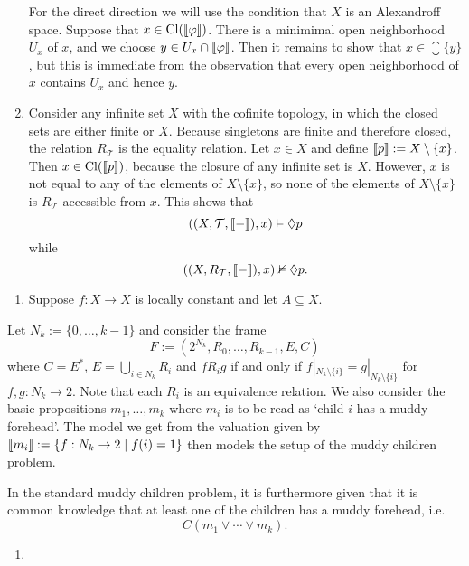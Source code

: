 \documentclass{article}
\newcommand{\topology}{{\mathcal{T}}}
\begin{document}
\begin{ex}
\begin{enumerate}
For the direct direction we will use the condition that $X$ is an Alexandroff
space. Suppose that $x\in\mathrm{Cl}(\llbracket\varphi\rrbracket)$. There is a minimimal
open neighborhood $U_x$ of $x$, and we choose $y\in U_x\cap\llbracket\varphi\rrbracket$.
Then it remains to show that $x\in\closure{\{y\}}$, but this is immediate from
the observation that every open neighborhood of $x$ contains $U_x$ and hence $y$.
\item Consider any infinite set $X$ with the cofinite topology, in which the closed
sets are either finite or $X$. Because singletons are finite and therefore
closed, the relation $R_\topology$ is the equality relation.
Let $x\in X$ and define $\llbracket p\rrbracket:=X\setminus\{x\}$. Then $x\in\mathrm{Cl}(\llbracket p\rrbracket)$,
because the closure of any infinite set is $X$. However, $x$ is not equal to any
of the elements of $X\setminus\{x\}$, so none of the elements of $X\setminus\{x\}$
is $R_\topology$-accessible from $x$. This shows that
\begin{equation*}
((X,\topology,\lsem{-}\rsem),x)\models \pos p
\end{equation*}
while
\begin{equation*}
((X,R_\topology,\lsem{-}\rsem),x)\nmodels \pos p.
\end{equation*}
\end{enumerate}
\end{ex}

\begin{ex}
\begin{enumerate}
\item Suppose $f:X\to X$ is locally constant and let $A\subseteq X$. 
\end{enumerate}
\end{ex}

\begin{ex}
Let $N_k:=\{0,\ldots,k-1\}$ and consider the frame 
\begin{equation*}
F:=(2^{N_k},R_0,\ldots,R_{k-1},E,C)
\end{equation*}
where $C=E^\ast$, $E=\bigcup_{i\in N_k}R_i$ and $f\mathbin{R_i}g$ if and only if 
$f|_{N_k\setminus\{i\}}=g|_{N_k\setminus\{i\}}$ for $f,g:N_k\to 2$.
Note that each $R_i$ is an equivalence relation. We also consider
the basic propositions $m_1,\ldots,m_k$ where $m_i$ is to be read
as `child $i$ has a muddy forehead'. The model we get from the
valuation given by $\llbracket m_i\rrbracket:=\{f:N_k\to 2\mid f(i)=1\}$
then models the setup of the muddy children problem.

In the standard muddy children problem, it is furthermore given
that it is common knowledge that at least one of the children
has a muddy forehead, i.e.~
\begin{equation*}
C(m_1\lor\cdots\lor m_k).
\end{equation*}
\begin{enumerate}
\item 
\end{enumerate}
\end{ex}
\end{document}
